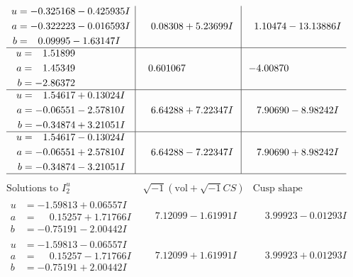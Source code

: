 \documentclass[1p]{elsarticle_modified}
\theoremstyle{definition}
\newcommand{\I}{\sqrt{-1}}
\begin{document}
$$\begin{array}{c|c|c}
\begin{aligned}
u &= -0.325168 - 0.425935 I \\
a &= -0.322223 - 0.016593 I \\
b &= \phantom{-}0.09995 - 1.63147 I\end{aligned}
 & \phantom{-}0.08308 + 5.23699 I & \phantom{-}1.10474 - 13.13886 I \\ \hline\begin{aligned}
u &= \phantom{-}1.51899\phantom{ +0.000000I} \\
a &= \phantom{-}1.45349\phantom{ +0.000000I} \\
b &= -2.86372\phantom{ +0.000000I}\end{aligned}
 & \phantom{-}0.601067\phantom{ +0.000000I} & -4.00870\phantom{ +0.000000I} \\ \hline\begin{aligned}
u &= \phantom{-}1.54617 + 0.13024 I \\
a &= -0.06551 - 2.57810 I \\
b &= -0.34874 + 3.21051 I\end{aligned}
 & \phantom{-}6.64288 + 7.22347 I & \phantom{-}7.90690 - 8.98242 I \\ \hline\begin{aligned}
u &= \phantom{-}1.54617 - 0.13024 I \\
a &= -0.06551 + 2.57810 I \\
b &= -0.34874 - 3.21051 I\end{aligned}
 & \phantom{-}6.64288 - 7.22347 I & \phantom{-}7.90690 + 8.98242 I\\
 \hline 
 \end{array}$$\newpage$$\begin{array}{c|c|c}  
\text{Solutions to }I^u_{2}& \I (\text{vol} + \sqrt{-1}CS) & \text{Cusp shape}\\
 \hline 
\begin{aligned}
u &= -1.59813 + 0.06557 I \\
a &= \phantom{-}0.15257 + 1.71766 I \\
b &= -0.75191 - 2.00442 I\end{aligned}
 & \phantom{-}7.12099 - 1.61991 I & \phantom{-}3.99923 - 0.01293 I \\ \hline\begin{aligned}
u &= -1.59813 - 0.06557 I \\
a &= \phantom{-}0.15257 - 1.71766 I \\
b &= -0.75191 + 2.00442 I\end{aligned}
 & \phantom{-}7.12099 + 1.61991 I & \phantom{-}3.99923 + 0.01293 I \\ \hline\begin{aligned}

\end{aligned}
\end{array}$$
\end{document}
